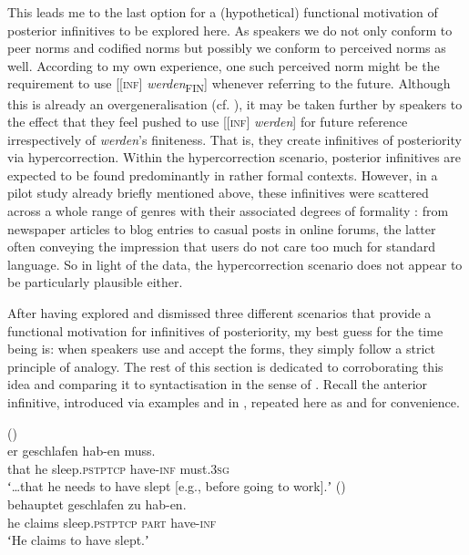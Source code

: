 \documentclass[output=paper,hidelinks]{langscibook}
\begin{document}
This leads me to the last option for a (hypothetical) functional motivation of posterior infinitives to be explored here. As speakers we do not only conform to peer norms and codified norms but possibly we conform to perceived norms as well. According to my own experience, one such perceived norm might be the requirement to use [[\textsc{inf}] \textit{werden}\textsubscript{FIN}] whenever referring to the future. Although this is already an overgeneralisation (cf. \citealt[102–103]{Eisenberg2013b}), it may be taken further by speakers to the effect that they feel pushed to use [[\textsc{inf}] \emph{werden}] for future reference irrespectively of \emph{werden}’s finiteness. That is, they create infinitives of posteriority via hypercorrection. Within the hypercorrection scenario, posterior infinitives are expected to be found predominantly in rather formal contexts. However, in a pilot study already briefly mentioned above, these infinitives were scattered across a whole range of genres with their associated degrees of formality \citep[507]{Reiner2015}: from newspaper articles to blog entries to casual posts in online forums, the latter often conveying the impression that users do not care too much for standard language. So in light of the data, the hypercorrection scenario does not appear to be particularly plausible either.

After having explored and dismissed three different scenarios that provide a functional motivation for infinitives of posteriority, my best guess for the time being is: when speakers use and accept the forms, they simply follow a strict principle of analogy. The rest of this section is dedicated to corroborating this idea and comparing it to syntactisation in the sense of \citet{Seiler2015}.
Recall the anterior infinitive, introduced via examples  and  in , repeated here as  and  for convenience.

\ea\label{ex:reiner:37}  () \\
	{er}	{geschlafen}		{hab-en}	{muss.}\\
that	he	sleep.\textsc{pstptcp}	have-\textsc{inf}	must.\textsc{3sg}\\
\glt ʻ…that he needs to have slept [e.g., before going to work].ʼ
\ex\label{ex:reiner:38}  () \\
	{behauptet}	{geschlafen}		{zu}	{hab-en.}\\
he	claims		sleep.\textsc{pstptcp}	\textsc{part}	have-\textsc{inf}\\
\glt ʻHe claims to have slept.ʼ
\z
\end{document}
